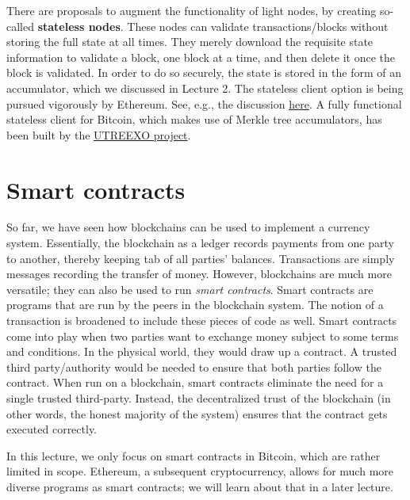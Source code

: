 \documentclass{article}
\begin{document}
There are proposals to augment the functionality of light nodes, by creating so-called \textbf{stateless nodes}. These nodes can validate transactions/blocks without storing the full state at all times. They merely download the requisite state information to validate a block, one block at a time, and then delete it once the block is validated. In order to do so securely, the state is stored in the form of an accumulator, which we discussed in Lecture 2. The stateless client option is being pursued vigorously by Ethereum. See, e.g., the discussion \href{https://ethresear.ch/t/the-stateless-client-concept/172}{here}. A fully functional stateless client for Bitcoin, which makes use of Merkle tree accumulators, has been built by the \href{https://www.media.mit.edu/projects/utreexo/overview/}{UTREEXO project}.

\section*{Smart contracts}
So far, we have seen how blockchains can be used to implement a currency system. Essentially, the blockchain as a ledger records payments from one party to another, thereby keeping tab of all parties' balances. Transactions are simply messages recording the transfer of money. However, blockchains are much more versatile; they can also be used to run \textit{smart contracts}. Smart contracts are programs that are run by the peers in the blockchain system. The notion of a transaction is broadened to include these pieces of code as well. Smart contracts come into play when two parties want to exchange money subject to some terms and conditions. In the physical world, they would draw up a contract. A trusted third party/authority would be needed to ensure that both parties follow the contract. When run on a blockchain, smart contracts eliminate the need for a single trusted third-party. Instead, the decentralized trust of the blockchain (in other words, the honest majority of the system) ensures that the contract gets executed correctly.

In this lecture, we only focus on smart contracts in Bitcoin, which are rather limited in scope. Ethereum, a subsequent cryptocurrency, allows for much more diverse programs as smart contracts; we will learn about that in a later lecture.
\end{document}
